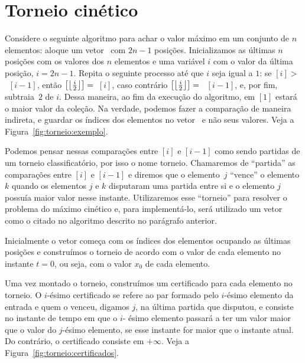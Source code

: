 
\newcommand{\thickness}{0.75mm}
\FloatBarrier


\section{Torneio cinético} \label{sec:torneio}

Considere o seguinte algoritmo para achar o valor máximo em um
conjunto de $n$ elementos: aloque um vetor \torneio~com $2n - 1$
posições.
Inicializamos as últimas $n$ posições com os valores dos $n$ elementos e uma variável $i$ com o
valor da última posição, $i = 2n - 1$.
Repita o seguinte processo até que $i$ seja igual a $1$: se \torneio$[i] > $~\torneio$[i - 1]$,
então \torneio$\left[\left\lfloor \frac{i}{2} \right\rfloor\right] =$~\torneio$[i]$, caso contrário
\torneio$\left[\left\lfloor \frac{i}{2} \right\rfloor\right] =$~ \torneio$[i - 1]$, e, por fim, subtraia~$2$ de $i$.
Dessa maneira, ao fim da execução do algoritmo, em \torneio$[1]$ estará o maior valor da coleção.
Na verdade, podemos fazer a comparação de maneira indireta, e guardar os índices dos elementos no
vetor \torneio~e não seus valores.
Veja a Figura~\ref{fig:torneio:exemplo}.

Podemos pensar nessas comparações entre \torneio$[i]$ e \torneio$[i-1]$ como sendo partidas de um
torneio classificatório, por isso o nome torneio.
Chamaremos de ``partida'' as comparações entre \torneio$[i]$ e \torneio$[i-1]$ e diremos que o
elemento~$j$ ``vence'' o elemento $k$ quando os elementos $j$ e $k$ disputaram uma partida entre
si e o elemento $j$ possuía maior valor nesse instante.
Utilizaremos esse ``torneio'' para resolver o problema do máximo cinético e, para implementá-lo,
será utilizado um vetor como o citado no algoritmo descrito no parágrafo anterior.



Inicialmente o vetor começa com os índices dos elementos ocupando as últimas posições e
construímos o torneio de acordo com o valor de cada elemento no instante $t = 0$, ou seja, com o
valor $x_0$ de cada elemento.

Uma vez montado o torneio, construímos um certificado para cada elemento no torneio.
O $i$-ésimo certificado se refere ao par formado pelo $i$-ésimo elemento da entrada e quem o
venceu, digamos $j$, na última partida que disputou, e consiste no instante de tempo em que o $i$-
ésimo elemento passará a ter um valor maior que o valor do $j$-ésimo elemento, se esse instante
for maior que o instante atual.
Do contrário, o certificado consiste em $+\infty$.
Veja a Figura~\ref{fig:torneio:certificados}.

